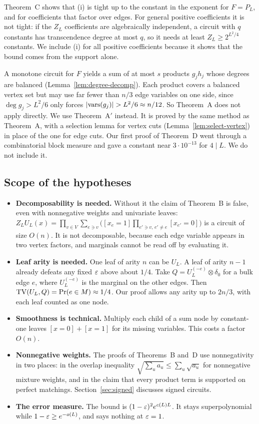 Theorem~C shows that (i) is tight up to the constant in the exponent for $F=P_L$, and for coefficients that factor over edges. For general positive coefficients it is not tight: if the $Z_L$ coefficients are algebraically independent, a circuit with $q$ constants has transcendence degree at most $q$, so it needs at least $Z_L\ge2^{L^2/4}$ constants. We include (i) for all positive coefficients because it shows that the bound comes from the support alone.

\begin{remark}\label{rem:K5-route}
A monotone circuit for $F$ yields a sum of at most $s$ products $g_jh_j$ whose degrees are balanced (Lemma~\ref{lem:degree-decomp}). Each product covers a balanced vertex set but may use far fewer than $n/3$ edge variables on one side, since $\deg g_j>L^2/6$ only forces $\lvert \operatorname{vars}(g_j)\rvert>L^2/6\approx n/12$. So Theorem~A does not apply directly. We use Theorem~A$'$ instead. It is proved by the same method as Theorem~A, with a selection lemma for vertex cuts (Lemma~\ref{lem:select-vertex}) in place of the one for edge cuts. Our first proof of Theorem~D went through a combinatorial block measure and gave a constant near $3\cdot10^{-13}$ for $4\mid L$. We do not include it.
\end{remark}

\subsection{Scope of the hypotheses}\label{sec:scope}

\begin{itemize}
\item \textbf{Decomposability is needed.} Without it the claim of Theorem~B is false, even with nonnegative weights and univariate leaves: $Z_LU_L(x)=\prod_{v\in V}\sum_{e\ni v}\bigl([x_e=1]\prod_{e'\ni v,\,e'\ne e}[x_{e'}=0]\bigr)$ is a circuit of size $O(n)$. It is not decomposable, because each edge variable appears in two vertex factors, and marginals cannot be read off by evaluating it.
\item \textbf{Leaf arity is needed.} One leaf of arity $n$ can be $U_L$. A leaf of arity $n-1$ already defeats any fixed $\varepsilon$ above about $1/4$. Take $Q=U_L^{(-e)}\otimes\delta_0$ for a bulk edge $e$, where $U_L^{(-e)}$ is the marginal on the other edges. Then $\mathrm{TV}(U_L,Q)=\Pr(e\in M)\approx1/4$. Our proof allows any arity up to $2n/3$, with each leaf counted as one node.
\item \textbf{Smoothness is technical.} Multiply each child of a sum node by constant-one leaves $[x=0]+[x=1]$ for its missing variables. This costs a factor $O(n)$.
\item \textbf{Nonnegative weights.} The proofs of Theorems~B and~D use nonnegativity in two places: in the overlap inequality $\sqrt{\sum_ua_u}\le\sum_u\sqrt{a_u}$ for nonnegative mixture weights, and in the claim that every product term is supported on perfect matchings. Section~\ref{sec:signed} discusses signed circuits.
\item \textbf{The error measure.} The bound is $(1-\varepsilon)^2e^{c(L)L}$. It stays superpolynomial while $1-\varepsilon\ge e^{-o(L)}$, and says nothing at $\varepsilon=1$.
\end{itemize}
